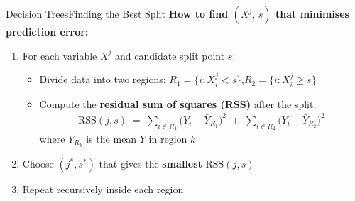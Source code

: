 \documentclass[hyperref={pdfpagelabels=false}]{beamer}
\begin{document}
\begin{frame}{Decision Trees}{Finding the Best Split}
\textbf{How to find $(X^j,\, s)$ that minimises prediction error:}
\vspace{0.2cm}
\begin{enumerate}
  \item For each variable $X^j$ and candidate split point $s$:
  \vspace{0.15cm}
  \begin{itemize}
    \item Divide data into two regions:
      $R_1=\{i:X^j_i<s\}$,\quad $R_2=\{i:X^j_i\geq s\}$
    \vspace{0.1cm}
    \item Compute the \textbf{residual sum of squares (RSS)} after the split:
    \begin{align*}
      \text{RSS}(j,s) \;=\;
      \sum_{i\in R_1}\!\bigl(Y_i - \bar{Y}_{R_1}\bigr)^2
      \;+\;
      \sum_{i\in R_2}\!\bigl(Y_i - \bar{Y}_{R_2}\bigr)^2
    \end{align*}
    where $\bar{Y}_{R_k}$ is the mean $Y$ in region $k$
  \end{itemize}
  \vspace{0.15cm}
  \item Choose $(j^*, s^*)$ that gives the \textbf{smallest} $\text{RSS}(j,s)$
  \vspace{0.15cm}
  \item Repeat recursively inside each region
\end{enumerate}
\end{frame}
\end{document}
